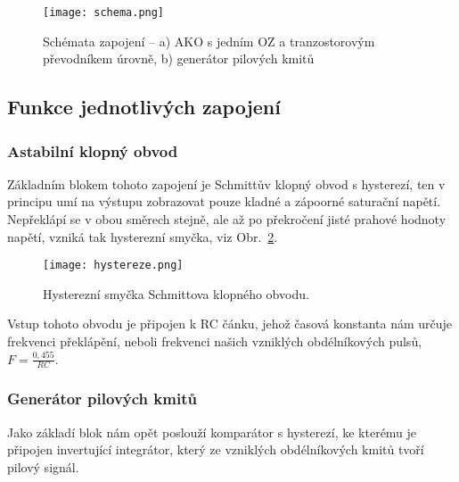 \begin{figure}[h!]
    \centering
    \texttt{[image: schema.png]}
    \centering
    \caption{Schémata zapojení -- a) AKO s jedním OZ a tranzostorovým převodníkem úrovně, b) generátor pilových kmitů}
    \label{fig:schema}
\end{figure}



\subsection{Funkce jednotlivých zapojení}

    \subsubsection{Astabilní klopný obvod}

    Základním blokem tohoto zapojení je Schmittův klopný obvod s hysterezí, ten v principu umí na výstupu zobrazovat pouze kladné a zápoorné saturační napětí. Nepřeklápí se v obou směrech stejně, ale až po překročení jisté prahové hodnoty napětí, vzniká tak hysterezní smyčka, viz Obr.~\ref{fig:hystereze-png}.

    \begin{figure}[h!]
        \centering
        \texttt{[image: hystereze.png]}
        \caption{Hysterezní smyčka Schmittova klopného obvodu.}
        \label{fig:hystereze-png}
    \end{figure}
    
    Vstup tohoto obvodu je připojen k RC čánku, jehož časová konstanta nám určuje frekvenci překlápění, neboli frekvenci našich vzniklých obdélníkových pulsů, \(F=\frac{0,455}{RC}\).

    \subsubsection{Generátor pilových kmitů}

    Jako základí blok nám opět poslouží komparátor s hysterezí, ke kterému je připojen invertující integrátor, který ze vzniklých obdélníkových kmitů tvoří pilový signál.
    
    
